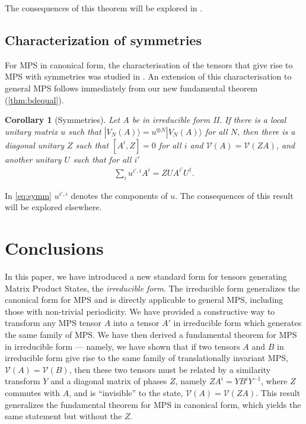 \documentclass[pra,a4paper,notitlepage,nofootinbib,superscriptaddress]{revtex4-1}
\theoremstyle{plain}
\newtheorem{corollary}[lemma]{Corollary}
\newcommand{\1}{{\openone}}
\newcommand{\be}{\begin{eqnarray}}
\newcommand{\ee}{\end{eqnarray}}
\newcommand{\ra}{\rangle}
\newcommand{\mc}{\mathcal}
\begin{document}

The consequences of this theorem will be explored in \cite{De16}.



\subsection{Characterization of symmetries}
\label{ssec:symm}

For MPS in canonical form, the characterisation of the tensors that give rise to MPS with symmetries was studied in \cite{Pe08}.
An extension of this characterisation to general MPS follows immediately from our new fundamental theorem (\cref{thm:bdequal}).

\begin{corollary}[Symmetries]
    Let $A$ be in irreducible form II.
    If there is a local unitary matrix $u$ such that
    $|V_N(A)\ra = u^{\otimes N} |V_N(A)\ra$ for all $N$,
    then there is a diagonal unitary $Z$
    such that $[A^i,Z]=0$ for all $i$ and $\mc{V}(A) = \mc{V}(ZA) $,
    and another unitary $U$ such that for all $i'$
    \be
        \sum_{i}u^{i',i} A^i = Z U A^{i'} U^\dagger .
        \label{eq:symm}
    \ee
\end{corollary}

In \eqref{eq:symm} $u^{i',i}$ denotes the components of $u$.
The consequences of this result will be explored elsewhere.


\section{Conclusions}
\label{sec:concl}


In this paper, we have introduced a new standard form for tensors
generating Matrix Product States, the \emph{irreducible form}. The
irreducible form generalizes the canonical form for MPS and is directly
applicable to general MPS, including those with non-trivial periodicity.
We have provided a constructive way to transform any MPS tensor $A$ into
a tensor $A'$ in irreducible form which generates the same family of MPS.
We have then derived a fundamental theorem for MPS in irreducible form ---
namely, we have shown that if two tensors $A$ and $B$ in irreducible form
give rise to the same family of translationally invariant MPS,
$\mc{V}(A)=\mc{V}(B)$, then these two tensors must be related by a
similarity transform $Y$ and a diagonal matrix of phases $Z$, namely $ZA^i
    = YB^iY^{-1}$,  where $Z$ commutes with $A$, and is ``invisible'' to
the state, $\mc{V}(A)=\mc{V}(ZA)$.  This result generalizes the
fundamental theorem for MPS in canonical form, which yields the same
statement but without the $Z$.
\end{document}
